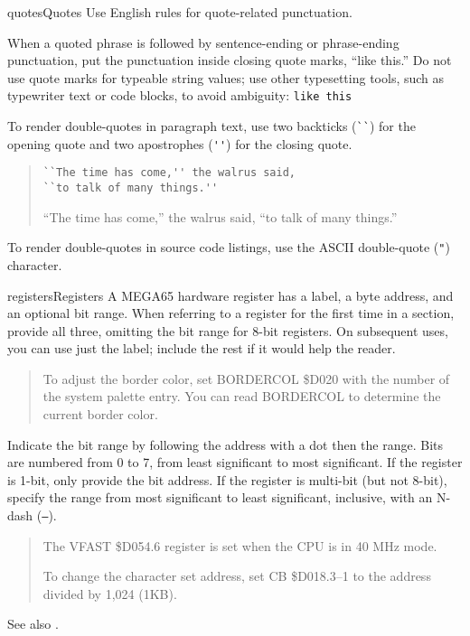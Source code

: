 \begin{sgentry}{quotes}{Quotes}
    Use English rules for quote-related punctuation.

    When a quoted phrase is followed by sentence-ending or phrase-ending punctuation, put the punctuation inside closing quote marks, ``like this.'' Do not use quote marks for typeable string values; use other typesetting tools, such as typewriter text or code blocks, to avoid ambiguity: \texttt{like this}

    To render double-quotes in paragraph text, use two backticks (\verb|``|) for the opening quote and two apostrophes (\verb|''|) for the closing quote.

    \begin{quote}
        \begin{verbatim}
``The time has come,'' the walrus said,
``to talk of many things.''
        \end{verbatim}

        \hrulefill

        ``The time has come,'' the walrus said, ``to talk of many things.''
    \end{quote}

    To render double-quotes in source code listings, use the ASCII double-quote (\verb|"|) character.
\end{sgentry}

\begin{sgentry}{registers}{Registers}
    A MEGA65 hardware register has a label, a byte address, and an optional bit range. When referring to a register for the first time in a section, provide all three, omitting the bit range for 8-bit registers. On subsequent uses, you can use just the label; include the rest if it would help the reader.

    \begin{quote}
        To adjust the border color, set BORDERCOL \$D020 with the number of the system palette entry. You can read BORDERCOL to determine the current border color.
    \end{quote}

    Indicate the bit range by following the address with a dot then the range. Bits are numbered from 0 to 7, from least significant to most significant. If the register is 1-bit, only provide the bit address. If the register is multi-bit (but not 8-bit), specify the range from most significant to least significant, inclusive, with an N-dash (\texttt{--}).

    \begin{quote}
        The VFAST \$D054.6 register is set when the CPU is in 40 MHz mode.

        To change the character set address, set CB \$D018.3--1 to the address divided by 1,024 (1KB).
    \end{quote}

    See also .
\end{sgentry}

